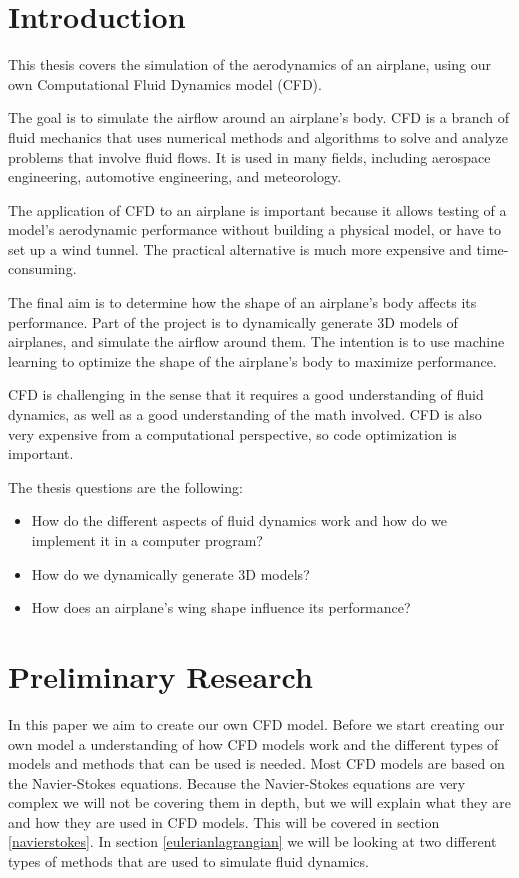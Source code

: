 \documentclass[a4paper,12pt,titlepage]{article}
\begin{document}
\section{Introduction}
This thesis covers the simulation of the aerodynamics of an airplane, using
our own Computational Fluid Dynamics model (CFD).

The goal is to simulate the airflow around an airplane's body. CFD is a
branch of fluid mechanics that uses numerical methods and algorithms to solve
and analyze problems that involve fluid flows. It is used in many fields,
including aerospace engineering, automotive engineering, and meteorology.

The application of CFD to an airplane is important because it allows testing
of a model's aerodynamic performance without building a physical model, or
have to set up a wind tunnel. The practical alternative is much more expensive
and time-consuming.

The final aim is to determine how the shape of an airplane's body affects its
performance. Part of the project is to dynamically generate 3D models of
airplanes, and simulate the airflow around them. The intention is to use
machine learning to optimize the shape of the airplane's body to maximize
performance.

CFD is challenging in the sense that it requires a good understanding of fluid
dynamics, as well as a good understanding of the math involved. CFD is also
very expensive from a computational perspective, so code optimization is important.

The thesis questions are the following:
\begin{itemize}
	\item{How do the different aspects of fluid dynamics work and how do we
		implement it in a computer program?}
	\item{How do we dynamically generate 3D models?}
	\item{How does an airplane's wing shape influence its performance?}
\end{itemize}
\pagebreak

\section{Preliminary Research}
In this paper we aim to create our own CFD model. 
Before we start creating our own model a understanding of how CFD models work 
and the different types of models and methods that can be used is needed.
Most CFD models are based on the Navier-Stokes equations. Because the Navier-Stokes equations are very complex we will not be covering them in depth, 
but we will explain what they are and how they are used in CFD models.
This will be covered in section \ref{navierstokes}.
In section \ref{eulerianlagrangian} we will be looking at two different types of methods that are used to simulate fluid dynamics.
\end{document}
